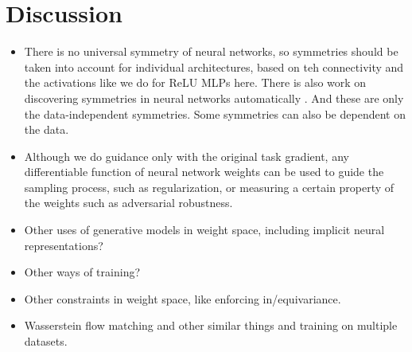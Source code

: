 
\chapter{Discussion}\label{chapter:discussion}

{\color{TUMBlue}

\begin{itemize}
    \item There is no universal symmetry of neural networks, so symmetries should be taken into account for individual architectures, based on teh connectivity and the activations like we do for ReLU MLPs here. There is also work on discovering symmetries in neural networks automatically \citep{zhaoFindingSymmetryNeural2024}. And these are only the data-independent symmetries. Some symmetries can also be dependent on the data. 
    \item Although we do guidance only with the original task gradient, any differentiable function of neural network weights can be used to guide the sampling process, such as regularization, or measuring a certain property of the weights such as adversarial robustness. 
    \item Other uses of generative models in weight space, including implicit neural representations? 
    \item Other ways of training? 
    \item Other constraints in weight space, like enforcing in/equivariance.
    \item Wasserstein flow matching and other similar things and training on multiple datasets. 
\end{itemize}

}